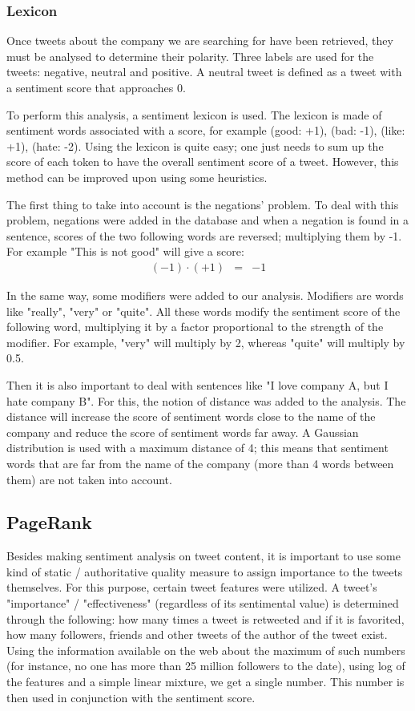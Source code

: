 \subsubsection{Lexicon}

Once tweets about the company we are searching for have been retrieved, they must be analysed to determine their polarity. 
Three labels are used for the tweets: negative, neutral and positive. A neutral tweet is defined as a tweet with a sentiment score that approaches 0. 

To perform this analysis, a sentiment lexicon is used. The lexicon is made of sentiment words associated with a score, for example (good: +1), (bad: -1), (like: +1), (hate: -2).
Using the lexicon is quite easy; one just needs to sum up the score of each token to have the overall sentiment score of a tweet. 
However, this method can be improved upon using some heuristics. 

The first thing to take into account is the negations' problem. To deal with this problem, negations were added in the database and when a negation is found in a sentence, 
scores of the two following words are reversed; multiplying them by -1. For example "This is not good" will give a score:
\begin{eqnarray}
	(-1) \cdot (+1) & = & -1
\end{eqnarray}

In the same way, some modifiers were added to our analysis. Modifiers are words like "really", "very" or "quite". 
All these words modify the sentiment score of the following word, multiplying it by a factor proportional to the strength of the modifier. For example, "very" will multiply by 2, whereas "quite" will multiply by 0.5.

Then it is also important to deal with sentences like "I love company A, but I hate company B". 
For this, the notion of distance was added to the analysis. The distance will increase the score of sentiment words close to the name of the company and reduce 
the score of sentiment words far away. A Gaussian distribution is used with a maximum distance of 4; this means that sentiment words that are far from the name 
of the company (more than 4 words between them) are not taken into account.

\subsection{PageRank}
Besides making sentiment analysis on tweet content, it is important to use some kind of static / authoritative quality measure to assign importance to the tweets themselves. For this purpose, certain tweet features were utilized. A tweet's "importance" / "effectiveness" (regardless of its sentimental value) is determined through the following: how many times a tweet is retweeted and if it is favorited, how many followers, friends and other tweets of the author of the tweet exist. Using the information available on the web about the maximum of such numbers (for instance, no one has more than 25 million followers to the date), using log of the features and a simple linear mixture, we get a single number. This number is then used in conjunction with the sentiment score.

